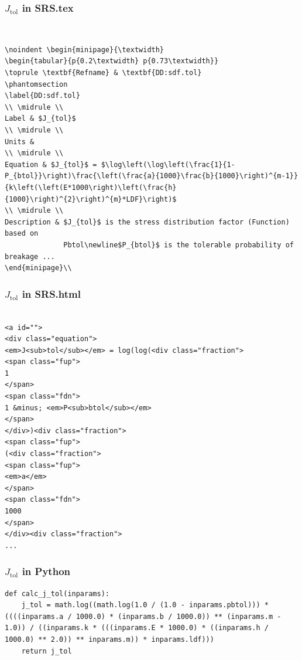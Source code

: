 \documentclass{beamer}
\begin{document}
\begin{frame}

\frametitle{$J_{\mbox{tol}}$ in SRS.tex}
~\\
\begin{lstlisting}
\noindent \begin{minipage}{\textwidth}
\begin{tabular}{p{0.2\textwidth} p{0.73\textwidth}}
\toprule \textbf{Refname} & \textbf{DD:sdf.tol}
\phantomsection 
\label{DD:sdf.tol}
\\ \midrule \\
Label & $J_{tol}$
\\ \midrule \\
Units & 
\\ \midrule \\
Equation & $J_{tol}$ = $\log\left(\log\left(\frac{1}{1-P_{btol}}\right)\frac{\left(\frac{a}{1000}\frac{b}{1000}\right)^{m-1}}{k\left(\left(E*1000\right)\left(\frac{h}{1000}\right)^{2}\right)^{m}*LDF}\right)$
\\ \midrule \\
Description & $J_{tol}$ is the stress distribution factor (Function) based on
              Pbtol\newline$P_{btol}$ is the tolerable probability of breakage ...
\end{minipage}\\
\end{lstlisting}
\end{frame}


\begin{frame}

\frametitle{$J_{\mbox{tol}}$ in SRS.html}

\begin{lstlisting}

<a id="">
<div class="equation">
<em>J<sub>tol</sub></em> = log(log(<div class="fraction">
<span class="fup">
1
</span>
<span class="fdn">
1 &minus; <em>P<sub>btol</sub></em>
</span>
</div>)<div class="fraction">
<span class="fup">
(<div class="fraction">
<span class="fup">
<em>a</em>
</span>
<span class="fdn">
1000
</span>
</div><div class="fraction">
...
\end{lstlisting}

\end{frame}

\begin{frame}

\frametitle{$J_{\mbox{tol}}$ in Python}

\begin{lstlisting}
def calc_j_tol(inparams):
    j_tol = math.log((math.log(1.0 / (1.0 - inparams.pbtol))) * ((((inparams.a / 1000.0) * (inparams.b / 1000.0)) ** (inparams.m - 1.0)) / ((inparams.k * (((inparams.E * 1000.0) * ((inparams.h / 1000.0) ** 2.0)) ** inparams.m)) * inparams.ldf)))
    return j_tol
\end{lstlisting}
\end{frame}
\end{document}
